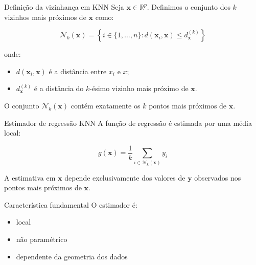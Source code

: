 \documentclass[
  ignorenonframetext,
  aspectratio=169,
]{beamer}
\providecommand{\tightlist}{%
  \setlength{\itemsep}{0pt}\setlength{\parskip}{0pt}}
\begin{document}
\begin{frame}
\begin{block}{Definição da vizinhança em KNN}
\label{definiuxe7uxe3o-da-vizinhanuxe7a-em-knn}
Seja \(\mathbf{x} \in \mathbb{R}^p\). Definimos o conjunto dos \(k\)
vizinhos mais próximos de \(\mathbf{x}\) como:

\[
\mathcal{N}_k(\mathbf{x}) = \left\{ i \in \{1,\dots,n\} : d(\mathbf{x}_i, \mathbf{x}) \le d_{\mathbf{x}}^{(k)} \right\}
\]

onde:

\begin{itemize}
\tightlist
\item
  \(d(\mathbf{x}_i, \mathbf{x})\) é a distância entre \(x_i\) e \(x\);
\item
  \(d_{\mathbf{x}}^{(k)}\) é a distância do \(k\)-ésimo vizinho mais
  próximo de \(\mathbf{x}\).
\end{itemize}

O conjunto \(\mathcal{N}_k(\mathbf{x})\) contém exatamente os \(k\)
pontos mais próximos de \(\mathbf{x}\).
\end{block}
\end{frame}

\begin{frame}
\begin{block}{Estimador de regressão KNN}
\label{estimador-de-regressuxe3o-knn}
A função de regressão é estimada por uma média local:

\[
g(\mathbf{x}) = \frac{1}{k} \sum_{i \in \mathcal{N}_k(\mathbf{x})} y_i
\]

A estimativa em \(\mathbf{x}\) depende exclusivamente dos valores de
\(\boldsymbol{y}\) observados nos pontos mais próximos de
\(\mathbf{x}\).
\end{block}
\end{frame}

\begin{frame}
\begin{block}{Característica fundamental}
\label{caracteruxedstica-fundamental}
O estimador é:

\begin{itemize}
\tightlist
\item
  local\\
\item
  não paramétrico\\
\item
  dependente da geometria dos dados
\end{itemize}
\end{block}
\end{frame}
\end{document}
